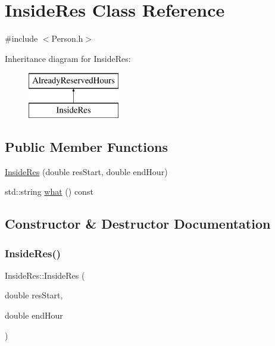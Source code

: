 \hypertarget{class_inside_res}{}\section{Inside\+Res Class Reference}
\label{class_inside_res}


{\ttfamily \#include $<$Person.\+h$>$}

Inheritance diagram for Inside\+Res\+:\begin{figure}[H]
\begin{center}
\leavevmode
\includegraphics[height=2.000000cm]{class_inside_res}
\end{center}
\end{figure}
\subsection*{Public Member Functions}
\begin{DoxyCompactItemize}
\item 
\mbox{\hyperlink{class_inside_res_ad447dd2fb8257c0e07ff171b6b8403d9}{Inside\+Res}} (double res\+Start, double end\+Hour)
\item 
std\+::string \mbox{\hyperlink{class_inside_res_af8e96688976739ec91630a369d4b94e7}{what}} () const
\end{DoxyCompactItemize}


\subsection{Constructor \& Destructor Documentation}
\mbox{\label{class_inside_res_ad447dd2fb8257c0e07ff171b6b8403d9}} 
\subsubsection{\texorpdfstring{Inside\+Res()}{InsideRes()}}
{\footnotesize\ttfamily Inside\+Res\+::\+Inside\+Res (\begin{DoxyParamCaption}\item[{double}]{res\+Start,  }\item[{double}]{end\+Hour }\end{DoxyParamCaption})\hspace{0.3cm}{\ttfamily [inline]}}



